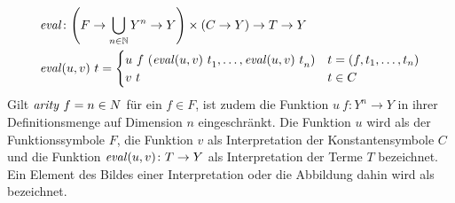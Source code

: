 \begin{equation*}
    \begin{split}
	\Const{eval} &\colon \paren*{F \rightarrow \bigcup_{n \in \mathbb{N}} Y^n \rightarrow Y} \times (C \rightarrow Y) \rightarrow T \rightarrow Y\\
	\Const{eval} &(u, v)~t = \begin{cases}
		u~f~(\elems {\Const{eval}(u, v)~t} 1 n) & t = (f, \tOneN)\\
		v~t                                      & t \in C\\
		\end{cases}
    \end{split}
\end{equation*}
Gilt $\mathit{arity}~f = n \in N$ für ein $f \in F$, ist zudem die Funktion $u~f \colon Y^n \rightarrow Y$ in ihrer Definitionsmenge auf Dimension $n$ eingeschränkt. 
Die Funktion $u$ wird als  der Funktionssymbole $F$, die Funktion $v$ als Interpretation der Konstantensymbole $C$ und die Funktion $\mathit{eval}(u, v) \colon T \rightarrow Y$ als Interpretation der Terme $T$ bezeichnet. 
Ein Element des Bildes einer Interpretation oder die Abbildung dahin wird als  bezeichnet.
\\~\\

